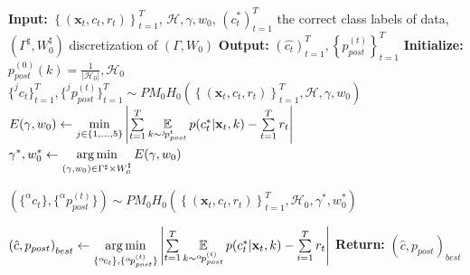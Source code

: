 \begin{algorithm}[htp!]
\caption{$PMH$ Model}\label{alg:2}
\begin{algorithmic}[1]
\Statex \textbf{Input:} $\left\{(\mathbf x_t,c_t,r_t)\right\}_{t=1}^{T}$, $\mathcal{H},\gamma,w_0$, $(c_t^\ast)_{t=1}^T$ the correct class labels of data, $(\Gamma^\sharp, W_0^\sharp)$ discretization of $(\Gamma, W_0)$
\Statex \textbf{Output:} ${(\hat{c_t})_{t=1}^T}, \left\{p_{post}^{(t)}\right\}_{t=1}^T$
\Statex \textbf{Initialize:} $p_{post}^{(0)}(k) = \frac{1}{\left |\mathcal{H}_0 \right |},\mathcal{H}_0 $
        \State $\{^{{j}}\!c_t\}_{t=1}^T,\{^{{j}}\!p^{(t)}_{post}\}_{t=1}^T\sim PM_0H_0(\left\{(\mathbf x_t,c_t,r_t)\right\}_{t=1}^T, \mathcal{H}, \gamma,w_0)$
    \EndFor
        \State $E(\gamma,w_0)\gets\min\limits_{j\in\{1,...,5\}}\left|\sum\limits_{t=1}^T{\operatorname*{\mathbb{E}}\limits
        _{k\sim^{j}\!p_{post}^t}p(c^\ast_t|\mathbf x_t,k)}-\sum\limits_{t=1}^Tr_t\right|$
\EndFor
\State $\gamma^\ast, w_0^\ast \gets \operatorname*{arg\,min}\limits_{(\gamma,w_0)\in\Gamma^\sharp\times W_0^\sharp} E(\gamma,w_0)$
\rule{0pt}{13pt}
    \State $(\{^\alpha\!c_t\}, \{^\alpha\!p_{post}^{(t)}\})  \sim PM_0H_0(\left\{(\mathbf x_t,c_t,r_t)\right\}_{t=1}^{T},\mathcal{H}_0,\gamma^*,w_0^*)$
\EndFor


\State $\left ( \hat{c},p_{post}  \right)_{best} \gets \operatorname*{arg\,min}\limits_{\{^\alpha\!c_t\} ,\{^\alpha\!p_{post}^{(t)}\} }
\left|\sum\limits_{t=1}^T{\operatorname*{\mathbb{E}}\limits
        _{k\sim^{\alpha}\!p_{post}^{(t)}}p(c^\ast_t|\mathbf x_t,k)}-\sum\limits_{i=1}^Tr_t\right|
$
\Statex \textbf{Return: } $ \left ( \hat{c},p_{post}  \right)_{best} $
\end{algorithmic}
\end{algorithm}










